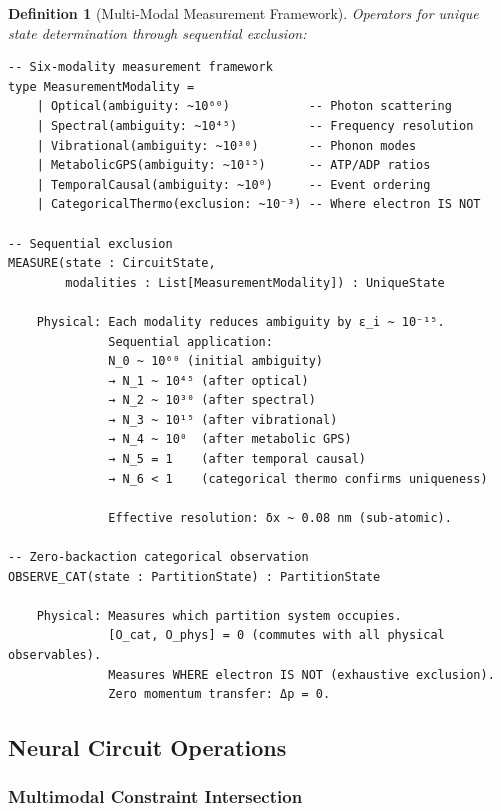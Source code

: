 \documentclass[aps,prd,twocolumn,superscriptaddress,floatfix,nofootinbib]{revtex4-2}
\newtheorem{definition}[theorem]{Definition}
\theoremstyle{remark}
\begin{document}
\begin{definition}[Multi-Modal Measurement Framework]
\label{def:measurement_ops}
Operators for unique state determination through sequential exclusion:
\begin{verbatim}
-- Six-modality measurement framework
type MeasurementModality =
    | Optical(ambiguity: ~10⁶⁰)           -- Photon scattering
    | Spectral(ambiguity: ~10⁴⁵)          -- Frequency resolution
    | Vibrational(ambiguity: ~10³⁰)       -- Phonon modes
    | MetabolicGPS(ambiguity: ~10¹⁵)      -- ATP/ADP ratios
    | TemporalCausal(ambiguity: ~10⁰)     -- Event ordering
    | CategoricalThermo(exclusion: ~10⁻³) -- Where electron IS NOT

-- Sequential exclusion
MEASURE(state : CircuitState,
        modalities : List[MeasurementModality]) : UniqueState
    
    Physical: Each modality reduces ambiguity by ε_i ~ 10⁻¹⁵.
              Sequential application:
              N_0 ~ 10⁶⁰ (initial ambiguity)
              → N_1 ~ 10⁴⁵ (after optical)
              → N_2 ~ 10³⁰ (after spectral)
              → N_3 ~ 10¹⁵ (after vibrational)
              → N_4 ~ 10⁰  (after metabolic GPS)
              → N_5 = 1    (after temporal causal)
              → N_6 < 1    (categorical thermo confirms uniqueness)
              
              Effective resolution: δx ~ 0.08 nm (sub-atomic).

-- Zero-backaction categorical observation
OBSERVE_CAT(state : PartitionState) : PartitionState
    
    Physical: Measures which partition system occupies.
              [O_cat, O_phys] = 0 (commutes with all physical observables).
              Measures WHERE electron IS NOT (exhaustive exclusion).
              Zero momentum transfer: Δp = 0.
\end{verbatim}
\end{definition}

\subsection{Neural Circuit Operations}

\subsubsection{Multimodal Constraint Intersection}
\end{document}
